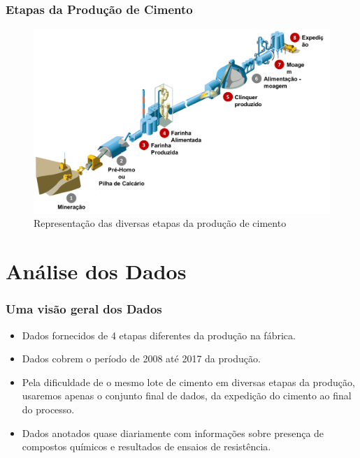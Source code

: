 \documentclass{beamer}
\begin{document}
\begin{frame}
\frametitle{Etapas da Produção de Cimento}
\begin{figure}[H]
\centering
\includegraphics[scale=0.5]{cimento.png}
\caption{Representação das diversas etapas da produção de cimento}
\end{figure}
\end{frame}

\section{Análise dos Dados}


\begin{frame}
  \frametitle{Uma visão geral dos Dados}
  \begin{itemize}
  \item Dados fornecidos de 4 etapas diferentes da produção na fábrica.
  \item Dados cobrem o período de 2008 até 2017 da produção.
    \item Pela dificuldade de  o mesmo lote de cimento em
      diversas etapas da produção, usaremos apenas o conjunto final de dados, da
      expedição do cimento ao final do processo.
      \item Dados anotados quase diariamente com informações sobre presença de
        compostos químicos e resultados de ensaios de resistência.
    \end{itemize}
\end{frame}
\end{document}
